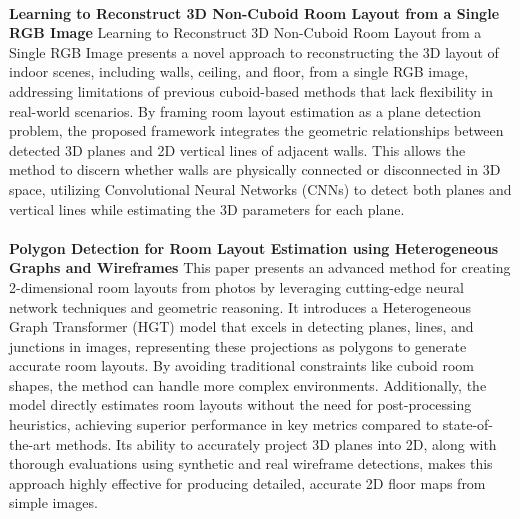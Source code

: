 \paragraph{}

\textbf{Learning to Reconstruct 3D Non-Cuboid Room Layout from a Single RGB Image} Learning to Reconstruct 3D Non-Cuboid Room Layout from a Single RGB Image\cite{9707088} presents a novel approach to reconstructing the 3D layout of indoor scenes, including walls, ceiling, and floor, from a single RGB image, addressing limitations of previous cuboid-based methods that lack flexibility in real-world scenarios. By framing room layout estimation as a plane detection problem, the proposed framework integrates the geometric relationships between detected 3D planes and 2D vertical lines of adjacent walls. This allows the method to discern whether walls are physically connected or disconnected in 3D space, utilizing Convolutional Neural Networks (CNNs) to detect both planes and vertical lines while estimating the 3D parameters for each plane.

\paragraph{}

\textbf{Polygon Detection for Room Layout Estimation using Heterogeneous Graphs and Wireframes}
This paper presents an advanced method for creating 2-dimensional room layouts from photos by leveraging cutting-edge neural network techniques and geometric reasoning. It introduces a Heterogeneous Graph Transformer (HGT) model that excels in detecting planes, lines, and junctions in images, representing these projections as polygons to generate accurate room layouts. By avoiding traditional constraints like cuboid room shapes, the method can handle more complex environments. Additionally, the model directly estimates room layouts without the need for post-processing heuristics, achieving superior performance in key metrics compared to state-of-the-art methods. Its ability to accurately project 3D planes into 2D, along with thorough evaluations using synthetic and real wireframe detections, makes this approach highly effective for producing detailed, accurate 2D floor maps from simple images.